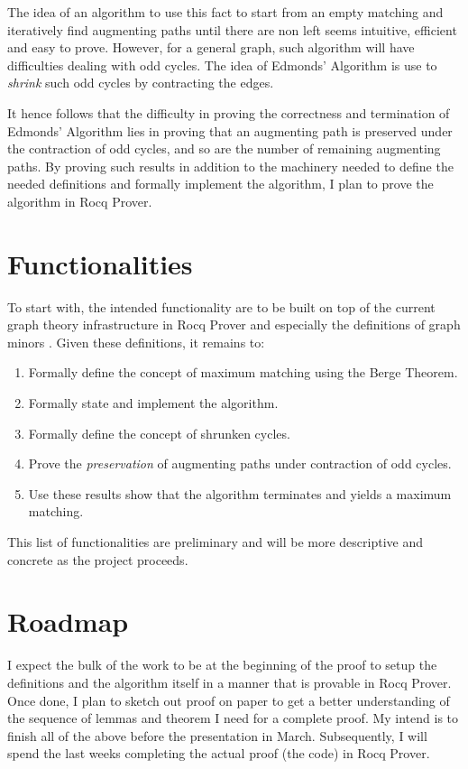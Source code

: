 \documentclass[acmsmall, screen, nonacm]{acmart}
\begin{document}
The idea of an algorithm to use this fact to start from an empty matching and iteratively find augmenting paths until there are non left seems intuitive, efficient and easy to prove. However, for a general graph, such algorithm will have difficulties dealing with odd cycles. The idea of Edmonds' Algorithm is use to \textit{shrink} such odd cycles by contracting the edges. 

It hence follows that the difficulty in proving the correctness and termination of Edmonds' Algorithm lies in proving that an augmenting path is preserved under the contraction of odd cycles, and so are the number of remaining augmenting paths. By proving such results in addition to the machinery needed to define the needed definitions and formally implement the algorithm, I plan to prove the algorithm in Rocq Prover.

\section{Functionalities}

To start with, the intended functionality are to be built on top of the current graph theory infrastructure in Rocq Prover and especially the definitions of graph minors \cite{CoqGraph}. Given these definitions, it remains to:
\begin{enumerate}
	\item Formally define the concept of maximum matching using the Berge Theorem.
	\item Formally state and implement the algorithm.
	\item Formally define the concept of shrunken cycles.
	\item Prove the \textit{preservation} of augmenting paths under contraction of odd cycles.
	\item Use these results show that the algorithm terminates and yields a maximum matching.
\end{enumerate}

This list of functionalities are preliminary and will be more descriptive and concrete as the project proceeds.

\section{Roadmap}

I expect the bulk of the work to be at the beginning of the proof to setup the definitions and the algorithm itself in a manner that is provable in Rocq Prover. Once done, I plan to sketch out proof on paper to get a better understanding of the sequence of lemmas and theorem I need for a complete proof. My intend is to finish all of the above before the presentation in March. Subsequently, I will spend the last weeks completing the actual proof (the code) in Rocq Prover. 
\end{document}
